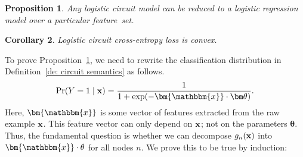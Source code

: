 \documentclass[letterpaper]{article} %
\newtheorem{corollary}{Corollary}
\newtheorem{proposition}[corollary]{Proposition}
\newcommand{\coe}{g}
\newcommand{\sample}{{\bf x}}
\begin{document}
\begin{proposition} 
\label{proposition: logistic regression}
Any logistic circuit model can be reduced to a logistic regression model over a particular feature~set.
\end{proposition}

\begin{corollary}
Logistic circuit cross-entropy loss is convex.
\end{corollary}

To prove Proposition~\ref{proposition: logistic regression}, we need to rewrite the classification distribution in Definition~\ref{de: circuit semantics} as follows.
$$
{\Pr} ( Y = 1 \mid {\bf x}) = \frac{1}{1+ \exp(- \bm{\mathbbm{x}} \cdot {\bm \theta})}.
$$ 
Here, $\bm{\mathbbm{x}}$ is some vector of features extracted from the raw example $\bf x$. This feature vector can only depend on $\bf x$; not on the parameters $\bm \theta$. 
Thus, the fundamental question is whether we can decompose $\coe_n(\sample)$ into $\bm{\mathbbm{x}} \cdot {\bf \theta}$ for all nodes $n$. We prove this to be true by induction:
\end{document}
